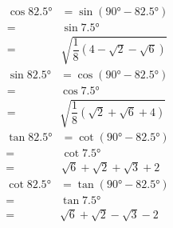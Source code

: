 \begin{align*}
	\cos\ang{82.5}&=\sin(\ang{90}-\ang{82.5})\\
	=&\sin\ang{7.5}\\
	=&\sqrt{\dfrac{1}{8}(4-\sqrt{2}-\sqrt{6})}
\end{align*}
\begin{align*}
	\sin\ang{82.5}&=\cos(\ang{90}-\ang{82.5})\\
	=&\cos\ang{7.5}\\
	=&\sqrt{\dfrac{1}{8}(\sqrt{2}+\sqrt{6}+4)}
\end{align*}
\begin{align*}
	\tan\ang{82.5}&=\cot(\ang{90}-\ang{82.5})\\
	=&\cot\ang{7.5}\\
	=&\sqrt{6}+\sqrt{2}+\sqrt{3}+2
\end{align*}
\begin{align*}
	\cot\ang{82.5}&=\tan(\ang{90}-\ang{82.5})\\
	=&\tan\ang{7.5}\\
	=&\sqrt{6}+\sqrt{2}-\sqrt{3}-2
\end{align*}